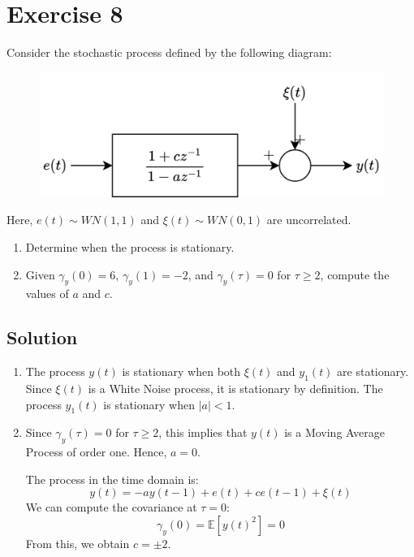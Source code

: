 \section{Exercise 8}

Consider the stochastic process defined by the following diagram:
\begin{figure}[H]
    \centering
    \includegraphics[width=0.5\linewidth]{images/block1.png}
\end{figure}
Here, $e(t) \sim WN(1,1)$ and $\xi(t) \sim WN(0,1)$ are uncorrelated.
\begin{enumerate}
    \item Determine when the process is stationary.
    \item Given $\gamma_y(0)=6$, $\gamma_y(1)=-2$, and $\gamma_y(\tau)=0$ for $\tau \geq 2$, compute the values of $a$ and $c$.
\end{enumerate}

\subsection*{Solution}
\begin{enumerate}
    \item The process $y(t)$ is stationary when both $\xi(t)$ and $y_1(t)$ are stationary.
        Since $\xi(t)$ is a  White Noise process, it is stationary by definition.
        The process $y_1(t)$ is stationary when $\left\lvert a \right\rvert<1$.
    \item Since $\gamma_y(\tau)=0$ for $\tau \geq 2$, this implies that $y(t)$ is a Moving Average Process of order one.
        Hence, $a=0$.

        The process in the time domain is: 
        \[y(t)=-ay(t-1)+e(t)+ce(t-1)+\xi(t)\]
        We can compute the covariance at $\tau=0$:
        \[\gamma_y(0)=\mathbb{E}\left[ {y(t)}^2 \right]=0\]
        From this, we obtain $c=\pm 2$. 
\end{enumerate}
